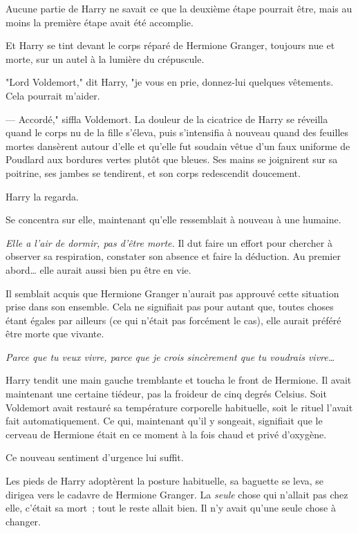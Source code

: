 Aucune partie de Harry ne savait ce que la deuxième étape pourrait être, mais au moins la première étape avait été accomplie.

Et Harry se tint devant le corps réparé de Hermione Granger, toujours nue et morte, sur un autel à la lumière du crépuscule.

"Lord Voldemort," dit Harry, "je vous en prie, donnez-lui quelques vêtements. Cela pourrait m'aider.

--- Accordé," siffla Voldemort. La douleur de la cicatrice de Harry se réveilla quand le corps nu de la fille s'éleva, puis s'intensifia à nouveau quand des feuilles mortes dansèrent autour d'elle et qu'elle fut soudain vêtue d'un faux uniforme de Poudlard aux bordures vertes plutôt que bleues. Ses mains se joignirent sur sa poitrine, ses jambes se tendirent, et son corps redescendit doucement.

Harry la regarda.

Se concentra sur elle, maintenant qu'elle ressemblait à nouveau à une humaine.

\emph{Elle a l'air de dormir, pas d'être morte.} Il dut faire un effort pour chercher à observer sa respiration, constater son absence et faire la déduction. Au premier abord… elle aurait aussi bien pu être en vie.

Il semblait acquis que Hermione Granger n'aurait pas approuvé cette situation prise dans son ensemble. Cela ne signifiait pas pour autant que, toutes choses étant égales par ailleurs (ce qui n'était pas forcément le cas), elle aurait préféré être morte que vivante.

\emph{Parce que tu veux vivre, parce que je crois sincèrement que tu voudrais vivre…}

Harry tendit une main gauche tremblante et toucha le front de Hermione. Il avait maintenant une certaine tiédeur, pas la froideur de cinq degrés Celsius. Soit Voldemort avait restauré sa température corporelle habituelle, soit le rituel l'avait fait automatiquement. Ce qui, maintenant qu'il y songeait, signifiait que le cerveau de Hermione était en ce moment à la fois chaud et privé d'oxygène.

Ce nouveau sentiment d'urgence lui suffit.

Les pieds de Harry adoptèrent la posture habituelle, sa baguette se leva, se dirigea vers le cadavre de Hermione Granger. La \emph{seule} chose qui n'allait pas chez elle, c'était sa mort~; tout le reste allait bien. Il n'y avait qu'une seule chose à changer.

